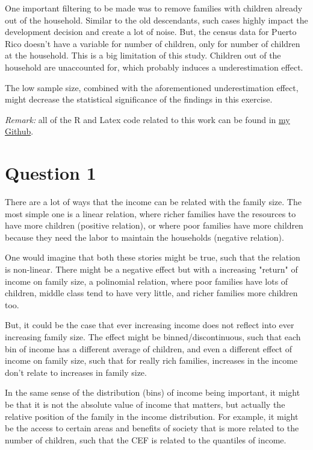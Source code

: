 \documentclass[12pt]{article}
\begin{document}
One important filtering to be made was to remove families with children already out of the household. Similar to the old descendants, such cases highly impact the development decision and create a lot of noise. But, the census data for Puerto Rico doesn't have a variable for number of children, only for number of children at the household. This is a big limitation of this study. Children out of the household are unaccounted for, which probably induces a underestimation effect.

The low sample size, combined with the aforementioned underestimation effect, might decrease the statistical significance of the findings in this exercise.

\textit{Remark:} all of the R and Latex code related to this work can be found in \href{https://github.com/ricardo-semiao/Econometrics1-task}{my Github}.


\section*{Question 1}

There are a lot of ways that the income can be related with the family size. The most simple one is a linear relation, where richer families have the resources to have more children (positive relation), or where poor families have more children because they need the labor to maintain the households (negative relation).

One would imagine that both these stories might be true, such that the relation is non-linear. There might be a negative effect but with a increasing "return" of income on family size, a polinomial relation, where poor families have lots of children, middle class tend to have very little, and richer families more children too.

But, it could be the case that ever increasing income does not reflect into ever increasing family size. The effect might be binned/discontinuous, such that each bin of income has a different average of children, and even a different effect of income on family size, such that for really rich families, increases in the income don't relate to increases in family size.

In the same sense of the distribution (bins) of income being important, it might be that it is not the absolute value of income that matters, but actually the relative position of the family in the income distribution. For example, it might be the access to certain areas and benefits of society that is more related to the number of children, such that the CEF is related to the quantiles of income.
\end{document}

